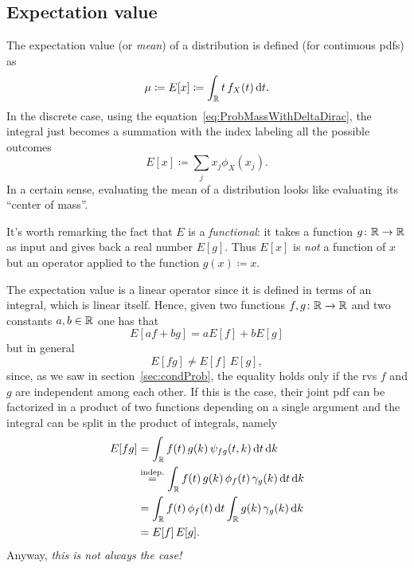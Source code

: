 \subsection{Expectation value}

The expectation value (or \emph{mean}) of a distribution is defined (for continuous \acp{pdf}) as
\begin{equation}
	\mu\coloneqq E[x]\coloneqq \int_{\mathbb{R}} t\,f_X(t)\mathop{}\!\mathrm{d} t.
\end{equation}
In the discrete case, using the equation~\eqref{eq:ProbMassWithDeltaDirac}, the integral just becomes a summation with the index labeling all the possible outcomes
\begin{equation}
	E[x] \coloneqq \sum_j x_j\phi_X(x_j).
\end{equation}
In a certain sense, evaluating the mean of a distribution looks like evaluating its ``center of mass''.


It's worth remarking the fact that $E$ is a \emph{functional}: it takes a function $g\colon\mathbb{R}\to\mathbb{R}$ as input and gives back a real number $E[g]$.
Thus $E[x]$ is \emph{not} a function of $x$ but an operator applied to the function $g(x) \coloneqq x$.


The expectation value is a linear operator since it is defined in terms of an integral, which is linear itself.
Hence, given two functions $f,g\colon \mathbb{R}\to\mathbb{R}$ and two constants $a,b\in\mathbb{R}$ one has that 
\begin{equation}
	E[af + b g] = aE[f] + bE[g]
\end{equation}
but in general
\begin{equation}
	E[fg]\neq E[f]\,E[g],
\end{equation}
since, as we saw in section~\ref{sec:condProb}, the equality holds only if the \acp{rv} $f$ and $g$ are independent among each other.
If this is the case, their joint \ac{pdf} can be factorized in a product of two functions depending on a single argument and the integral can be split in the product of integrals, namely
\begin{equation}
	\begin{aligned}
		E[fg]
		&= \int_{\mathbb{R}} f(t)\,g(k)\,\psi_{fg}(t,k)\mathop{}\!\mathrm{d} t\mathop{}\!\mathrm{d} k\\
		&\overset{\text{indep.}}{=} \int_{\mathbb{R}} f(t)\,g(k)\,\phi_{f}(t)\,\gamma_g(k)\mathop{}\!\mathrm{d} t\mathop{}\!\mathrm{d} k\\
  &= \int_{\mathbb{R}} f(t)\,\phi_{f}(t)\mathop{}\!\mathrm{d} t\int_{\mathbb{R}} g(k)\,\gamma_g(k)\mathop{}\!\mathrm{d} k\\
  &= E[f]\,E[g].
	\end{aligned}
\end{equation}
Anyway, \emph{this is not always the case!}


